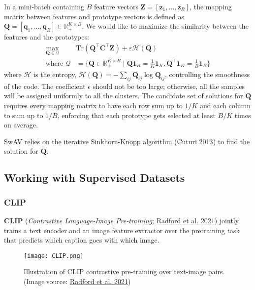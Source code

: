 \documentclass[12pt]{article}
\begin{document}
In a mini-batch containing $B$ feature vectors $\mathbf{Z} = [\mathbf{z}_1, \dots, \mathbf{z}_B]$, the mapping matrix between features and prototype vectors is defined as $\mathbf{Q} = [\mathbf{q}_1, \dots, \mathbf{q}_B] \in \mathbb{R}_+^{K\times B}$. We would like to maximize the similarity between the features and the prototypes:
\[
\begin{aligned}
\max_{\mathbf{Q}\in\mathcal{Q}} &\text{Tr}(\mathbf{Q}^\top \mathbf{C}^\top \mathbf{Z}) + \varepsilon \mathcal{H}(\mathbf{Q}) \\
\text{where }\mathcal{Q} &= \big\{ \mathbf{Q} \in \mathbb{R}_{+}^{K \times B} \mid \mathbf{Q}\mathbf{1}_B = \frac{1}{K}\mathbf{1}_K, \mathbf{Q}^\top\mathbf{1}_K = \frac{1}{B}\mathbf{1}_B \big\}
\end{aligned}
\]
where $\mathcal{H}$ is the entropy, $\mathcal{H}(\mathbf{Q}) = - \sum_{ij} \mathbf{Q}_{ij} \log \mathbf{Q}_{ij}$, controlling the smoothness of the code. The coefficient $\epsilon$ should not be too large; otherwise, all the samples will be assigned uniformly to all the clusters. The candidate set of solutions for $\mathbf{Q}$ requires every mapping matrix to have each row sum up to $1/K$ and each column to sum up to $1/B$, enforcing that each prototype gets selected at least $B/K$ times on average.

SwAV relies on the iterative Sinkhorn-Knopp algorithm (\href{https://arxiv.org/abs/1306.0895}{Cuturi 2013}) to find the solution for $\mathbf{Q}$.

\subsection{Working with Supervised Datasets}

\subsubsection{CLIP}
\textbf{CLIP} (\emph{Contrastive Language-Image Pre-training}; \href{https://arxiv.org/abs/2103.00020}{Radford et al. 2021}) jointly trains a text encoder and an image feature extractor over the pretraining task that predicts which caption goes with which image.

\begin{figure}[H]
    \centering
    \texttt{[image: CLIP.png]}
    \caption{Illustration of CLIP contrastive pre-training over text-image pairs. (Image source: \href{https://arxiv.org/abs/2103.00020}{Radford et al. 2021})}
\end{figure}
\end{document}
